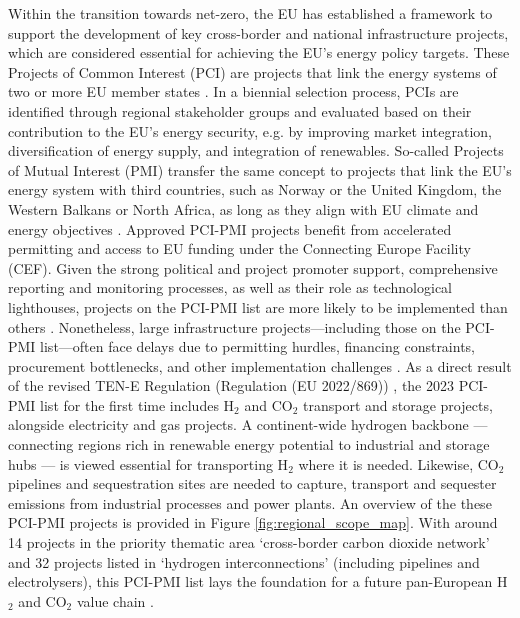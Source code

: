 \documentclass[pdflatex,sn-nature]{sn-jnl}%
\theoremstyle{thmstyleone}%
\theoremstyle{thmstyletwo}%
\theoremstyle{thmstylethree}%
\begin{document}
Within the transition towards net-zero, the EU has established a framework to support the development of key cross-border and national infrastructure projects, which are considered essential for achieving the EU's energy policy targets. These Projects of Common Interest (PCI) are projects that link the energy systems of two or more EU member states \cite{europeancommissionRegulationEUNo2022}. In a biennial selection process, PCIs are identified through regional stakeholder groups and evaluated based on their contribution to the EU's energy security, e.g. by improving market integration, diversification of energy supply, and integration of renewables. So-called Projects of Mutual Interest (PMI) transfer the same concept to projects that link the EU's energy system with third countries, such as Norway or the United Kingdom, the Western Balkans or North Africa, as long as they align with EU climate and energy objectives \cite{europeancommissionCommissionDelegatedRegulation2023}. Approved PCI-PMI projects benefit from accelerated permitting and access to EU funding under the Connecting Europe Facility (CEF). Given the strong political and project promoter support, comprehensive reporting and monitoring processes, as well as their role as technological lighthouses, projects on the PCI-PMI list are more likely to be implemented than others \cite{europeancommission.directorategeneralforenergy.InvestmentNeedsEuropean2025}. Nonetheless, large infrastructure projects—including those on the PCI-PMI list—often face delays due to permitting hurdles, financing constraints, procurement bottlenecks, and other implementation challenges \cite{acerConsolidatedReportProgress2023}. 
As a direct result of the revised TEN-E Regulation (Regulation (EU 2022/869)) \cite{europeanparliamentRegulationEU20222022}, the 2023 PCI-PMI list \cite{europeancommissionCommissionDelegatedRegulation2023,europeancommissionPCIPMITransparencyPlatform2024} for the first time includes H$_2$ and CO$_2$ transport and storage projects, alongside electricity and gas projects. A continent-wide hydrogen backbone --- connecting regions rich in renewable energy potential to industrial and storage hubs --- is viewed essential for transporting H$_2$ where it is needed. Likewise, CO$_2$ pipelines and sequestration sites are needed to capture, transport and sequester emissions from industrial processes and power plants. An overview of the these PCI-PMI projects is provided in Figure \ref{fig:regional_scope_map}. With around 14 projects in the priority thematic area `cross-border carbon dioxide network' and 32 projects listed in `hydrogen interconnections' (including pipelines and electrolysers), this PCI-PMI list lays the foundation for a future pan-European H$_2$ and CO$_2$ value chain \cite{europeancommissionAnnexFirstUnion2023}.
\end{document}
